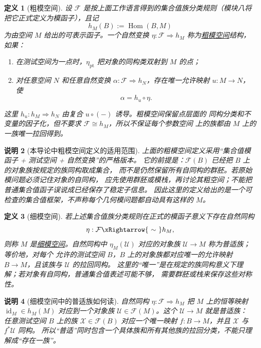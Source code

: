 \documentclass[UTF8,fontset=none,a4paper,11pt]{ctexart}
\theoremstyle{foundation-definition}
\newtheorem{definition}{定义}[section]
\theoremstyle{foundation-theorem}
\theoremstyle{foundation-proposition}
\theoremstyle{foundation-example}
\theoremstyle{foundation-remark}
\newtheorem{remark}[definition]{说明}
\theoremstyle{foundation-theorem}
\newcommand{\term}[2]{\hyperref[#1]{#2}}
\begin{document}
\begin{definition}[粗模空间]\label{def:coarse-moduli-space}
设 \(\mathcal F\) 是按上面工作语言得到的集合值族分类规则（模块八将把它正式定义为模函子），且记
\[
h_M(B):=\operatorname{Hom}(B,M)
\]
为由空间 \(M\) 给出的可表示函子。一个自然变换
\(\eta:\mathcal F\Rightarrow h_M\) 称为\term{def:coarse-moduli-space}{粗模空间}结构，如果：
\begin{enumerate}[label=(\alph*)]
  \item 在测试空间为一点时，\(\eta_{\mathrm{pt}}\) 把对象的同构类双射到 \(M\) 的点；
  \item 对任意空间 \(N\) 和任意自然变换
  \(\alpha:\mathcal F\Rightarrow h_N\)，存在唯一允许映射
  \(u:M\to N\)，使
  \[
  \alpha=h_u\circ\eta.
  \]
\end{enumerate}
这里 \(h_u:h_M\Rightarrow h_N\) 由复合 \(u\circ(-)\) 诱导。粗模空间保留点层面的
同构分类和不变量的因子化，但不要求 \(\mathcal F\cong h_M\)，所以不保证每个参数空间
上的族都由 \(M\) 上的一族唯一拉回得到。
\end{definition}

\begin{remark}[本导论中粗模空间定义的适用范围]\label{rem:coarse-moduli-scope}
上面的粗模空间定义采用“集合值模函子 + 测试空间 + 自然变换”的严格版本。
它的前提是：\(\mathcal F(B)\) 已经把 \(B\) 上的对象族按规定的族同构取成集合，
而不是仍然保留所有自同构的群胚。若原始模问题必须记住对象的自同构，
应先使用群胚或模栈，再讨论其粗空间；不能把普通集合值函子误说成已经保存了稳定子信息。
因此这里的定义给出的是一个可检查的集合值框架，不声称每个几何模问题都自动具有这样的 \(M\)。
\end{remark}

\begin{definition}[细模空间]\label{def:fine-moduli-space}
若上述集合值族分类规则在正式的模函子意义下存在自然同构
\[
\eta:\mathcal F\xRightarrow{\ \sim\ }h_M,
\]
则称 \(M\) 是\term{def:fine-moduli-space}{细模空间}。自然同构中
\(\eta_M(\mathcal U)\) 对应的对象族 \(\mathcal U\to M\) 称为普适族；等价地，对每个
允许的测试空间 \(B\)，\(B\) 上的对象族都对应唯一的允许映射 \(B\to M\)，且该族与
\(\mathcal U\) 的拉回同构。
这里的“唯一”是在规定的族同构意义下理解；若对象有自同构，普通集合值表述可能不够，
需要群胚或栈来保存这些对称性。
\end{definition}

\begin{remark}[细模空间中的普适族如何读]\label{rem:fine-universal-family-reading}
自然同构 \(\eta:\mathcal F\Rightarrow h_M\) 把 \(M\) 上的恒等映射
\(\operatorname{id}_M\in h_M(M)\) 对应到一个对象族
\(\mathcal U\in\mathcal F(M)\)。这个 \(\mathcal U\to M\) 就是普适族：
任意测试空间 \(B\) 上的族 \(\mathcal X\in\mathcal F(B)\) 对应一个唯一映射
\(f:B\to M\)，并且 \(\mathcal X\) 与 \(f^*\mathcal U\) 同构。
所以“普适”同时包含一个具体族和所有其他族的拉回分类，不能只理解成“存在一族”。
\end{remark}
\end{document}

